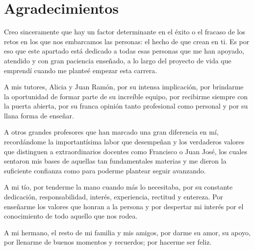 
\clearpage
\thispagestyle{empty}
\chapter*{Agradecimientos}
Creo sinceramente que hay un factor determinante en el éxito o el fracaso de los retos en los que nos embarcamos las personas: el hecho de que crean en ti. Es por eso que este apartado está dedicado a todas esas personas que me han apoyado, atendido y con gran paciencia enseñado, a lo largo del proyecto de vida que emprendí cuando me planteé empezar esta carrera.

A mis tutores, Alicia y Juan Ramón, por su intensa implicación, por brindarme la oportunidad de formar parte de su increíble equipo, por recibirme siempre con la puerta abierta, por su franca opinión tanto profesional como personal y por su llana forma de enseñar.

A otros grandes profesores que han marcado una gran diferencia en mí, recordándome la importantísima labor que desempeñan y los verdaderos valores que distinguen a extraordinarios docentes como Francisco o Juan José, los cuales sentaron mis bases de aquellas tan fundamentales materias y me dieron la suficiente confianza como para poderme plantear seguir avanzando.

A mi tío, por tenderme la mano cuando más lo necesitaba, por su constante dedicación, responsabilidad, interés, experiencia, rectitud y entereza. Por enseñarme los valores que honran a la persona y por despertar mi interés por el conocimiento de todo aquello que nos rodea.

A mi hermano, el resto de mi familia y mis amigos, por darme su amor, su apoyo, por llenarme de buenos momentos y recuerdos; por hacerme ser feliz.